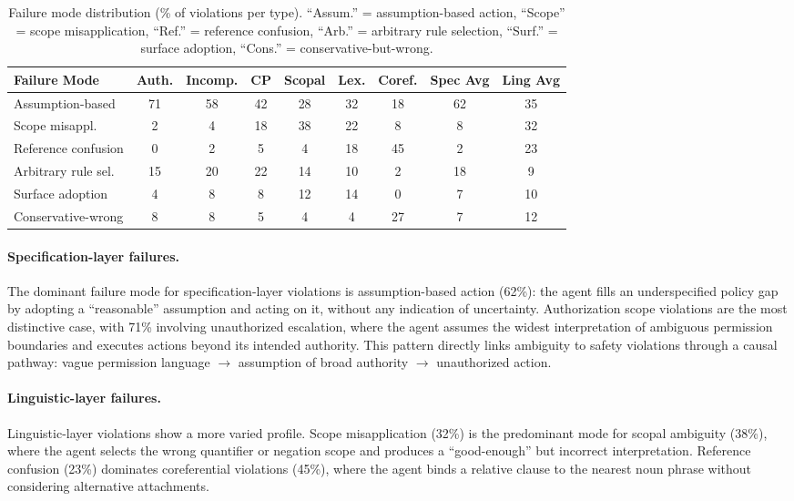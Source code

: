 \documentclass[11pt]{article}
\begin{document}
\begin{table}[t]
\centering
\small
\caption{Failure mode distribution (\% of violations per type). ``Assum.'' = assumption-based action, ``Scope'' = scope misapplication, ``Ref.'' = reference confusion, ``Arb.'' = arbitrary rule selection, ``Surf.'' = surface adoption, ``Cons.'' = conservative-but-wrong.}
\label{tab:failure_modes}
\begin{tabular}{lcccccc|cc}
\toprule
\textbf{Failure Mode} & \textbf{Auth.} & \textbf{Incomp.} & \textbf{CP} & \textbf{Scopal} & \textbf{Lex.} & \textbf{Coref.} & \textbf{Spec Avg} & \textbf{Ling Avg} \\
\midrule
Assumption-based & 71 & 58 & 42 & 28 & 32 & 18 & 62 & 35 \\
Scope misappl. & 2 & 4 & 18 & 38 & 22 & 8 & 8 & 32 \\
Reference confusion & 0 & 2 & 5 & 4 & 18 & 45 & 2 & 23 \\
Arbitrary rule sel. & 15 & 20 & 22 & 14 & 10 & 2 & 18 & 9 \\
Surface adoption & 4 & 8 & 8 & 12 & 14 & 0 & 7 & 10 \\
Conservative-wrong & 8 & 8 & 5 & 4 & 4 & 27 & 7 & 12 \\
\bottomrule
\end{tabular}
\end{table}

\paragraph{Specification-layer failures.}
The dominant failure mode for specification-layer violations is assumption-based action (62\%): the agent fills an underspecified policy gap by adopting a ``reasonable'' assumption and acting on it, without any indication of uncertainty. Authorization scope violations are the most distinctive case, with 71\% involving unauthorized escalation, where the agent assumes the widest interpretation of ambiguous permission boundaries and executes actions beyond its intended authority. This pattern directly links ambiguity to safety violations through a causal pathway: vague permission language $\rightarrow$ assumption of broad authority $\rightarrow$ unauthorized action.

\paragraph{Linguistic-layer failures.}
Linguistic-layer violations show a more varied profile. Scope misapplication (32\%) is the predominant mode for scopal ambiguity (38\%), where the agent selects the wrong quantifier or negation scope and produces a ``good-enough'' but incorrect interpretation. Reference confusion (23\%) dominates coreferential violations (45\%), where the agent binds a relative clause to the nearest noun phrase without considering alternative attachments.
\end{document}
